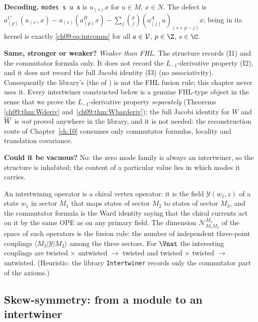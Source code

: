 \begin{dictionary}
\textbf{Decoding.} \texttt{modes s u x} is $u_{(s)}x$ for $u\in M$, $x\in N$. The defect is
$a^C_{(p)}(u_{(s)}x)-u_{(s)}(a^B_{(p)}x)-\sum_j\binom{p}{j}(a^A_{(j)}u)_{(s+p-j)}x$; being in its
kernel is exactly \eqref{ch09:eq:intcomm} for all $a\in\mathcal{V}$, $p\in\Z$, $s\in\C$.

\textbf{Same, stronger or weaker?} \emph{Weaker than FHL.} The structure records (I1) and the
commutator formula only. It does not record the $L_{-1}$-derivative property (I2), and it does not
record the full Jacobi identity (I3) (no associativity). Consequently the library's
 (the  of ) is not the FHL fusion rule;
this chapter never uses it. Every intertwiner constructed below is a genuine FHL-type object in
the sense that we prove the $L_{-1}$-derivative property \emph{separately} (Theorems
\ref{ch09:thm:Wderiv} and~\ref{ch09:thm:Wbarderiv}); the full Jacobi identity for $W$ and
$\overline{W}$ is \emph{not} proved anywhere in the library, and it is not needed: the
reconstruction route of Chapter~\ref{ch:10} consumes only commutator formulas, locality and
translation covariance.

\textbf{Could it be vacuous?} No: the zero mode family is always an intertwiner, so the structure
is inhabited; the content of a particular  value lies in which modes it carries.
\end{dictionary}

\begin{physics}
An intertwining operator is a chiral vertex operator: it is the field $\mathcal Y(w_1,z)$ of a state $w_1$ in sector $M_1$ that maps states of sector $M_2$ to states of sector $M_3$, and the commutator formula is the Ward identity saying that the chiral currents act on it by the same OPE as on any primary field. The dimension $\mathcal N^{M_3}_{M_1M_2}$ of the space of such operators is the fusion rule: the number of independent three-point couplings $\langle M_3|\mathcal Y|M_2\rangle$ among the three sectors. For $\Vnat$ the interesting couplings are twisted $\times$ untwisted $\to$ twisted and twisted $\times$ twisted $\to$ untwisted. (Heuristic: the library \texttt{Intertwiner} records only the commutator part of the axioms.)
\end{physics}

\subsection{Skew-symmetry: from a module to an intertwiner}

